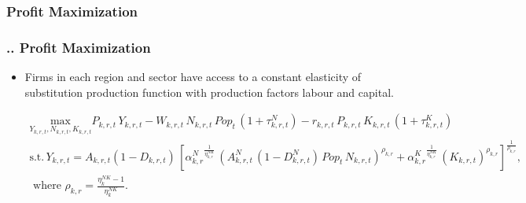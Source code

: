 \documentclass[11pt,aspectratio=169]{beamer}
\begin{document}
\subsubsection{Profit Maximization}
\begin{frame}
\frametitle{{\thesection.\thesubsection.\thesubsubsection} Profit Maximization}
\scriptsize
\begin{itemize}
\item Firms in each region and sector have access to a constant elasticity of substitution production function with production factors labour and capital.

\begin{align*}
\underset{Y_{k,r,t}, N_{k,r,t}, K_{k,r,t}}{\mathrm{max}} P_{k,r,t} \, Y_{k,r,t} - W_{k,r,t} \, N_{k,r,t} \, Pop_{t} \, (1 + \tau^{N}_{k,r,t}) - r_{k,r,t} \, P_{k,r,t} \, K_{k,r,t} \, (1 + \tau^{K}_{k,r,t})\nonumber \\ 
\mbox{s.t.} \, Y_{k,r,t} = A_{k,r,t} (1 - D_{k,r,t}) \, \left[{\alpha^{N}_{k,r}}^{\frac{1}{\eta^{NK}_{k,r}}} \, \left( A^{N}_{k,r,t} \, (1 - D^{N}_{k,r,t}) \, Pop_{t} \, N_{k,r,t}\right)^{\rho_{k,r}} + {\alpha^{K}_{k,r}}^{\frac{1}{\eta^{NK}_{k,r}}} \, \left(K_{k,r,t}\right)^{\rho_{k,r}}\right]^{\frac{1}{\rho_{k,r}}}, \nonumber \\
\mbox{ where } \rho_{k,r} = \frac{\eta^{NK}_{k} - 1}{\eta^{NK}_{k}}.
\end{align*}
\end{itemize}
\end{frame}
\end{document}
